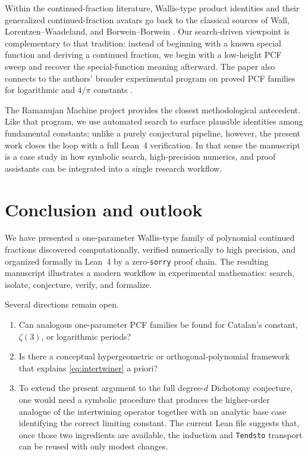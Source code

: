 \documentclass[11pt,reqno]{amsart}
\theoremstyle{plain}
\theoremstyle{definition}
\theoremstyle{remark}
\begin{document}
Within the continued-fraction literature, Wallis-type product identities and their generalized continued-fraction avatars go back to the classical sources of Wall, Lorentzen--Waadeland, and Borwein--Borwein \cite{wall1948analytic,lorentzen1992continued,borwein1987pi}.  Our search-driven viewpoint is complementary to that tradition: instead of beginning with a known special function and deriving a continued fraction, we begin with a low-height PCF sweep and recover the special-function meaning afterward.  The paper also connects to the authors' broader experimental program on proved PCF families for logarithmic and $4/\pi$ constants \cite{papanokechi2026pcf}.

The Ramanujan Machine project \cite{raayoni2021} provides the closest methodological antecedent.  Like that program, we use automated search to surface plausible identities among fundamental constants; unlike a purely conjectural pipeline, however, the present work closes the loop with a full Lean~4 verification.  In that sense the manuscript is a case study in how symbolic search, high-precision numerics, and proof assistants can be integrated into a single research workflow.

\section{Conclusion and outlook}

We have presented a one-parameter Wallis-type family of polynomial continued fractions discovered computationally, verified numerically to high precision, and organized formally in Lean~4 by a zero-\texttt{sorry} proof chain.  The resulting manuscript illustrates a modern workflow in experimental mathematics: search, isolate, conjecture, verify, and formalize.

Several directions remain open.
\begin{enumerate}[label=\textup{(\arabic*)}]
  \item Can analogous one-parameter PCF families be found for Catalan's constant, $\zeta(3)$, or logarithmic periods?
  \item Is there a conceptual hypergeometric or orthogonal-polynomial framework that explains \eqref{eq:intertwiner} a priori?
  \item To extend the present argument to the full degree-$d$ Dichotomy conjecture, one would need a symbolic procedure that produces the higher-order analogue of the intertwining operator together with an analytic base case identifying the correct limiting constant.  The current Lean file suggests that, once those two ingredients are available, the induction and \texttt{Tendsto} transport can be reused with only modest changes.
\end{enumerate}
\end{document}
